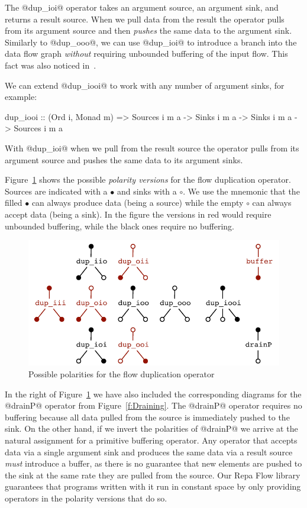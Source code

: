 The @dup_ioi@ operator takes an argument source, an argument sink, and returns a result source. When we pull data from the result the operator pulls from its argument source and then \emph{pushes} the same data to the argument sink. Similarly to @dup_ooo@, we can use @dup_ioi@ to introduce a branch into the data flow graph \emph{without} requiring unbounded buffering of the input flow. This fact was also noticed in~\cite{Bernardy:Duality}.

\eject
We can extend @dup_iooi@ to work with any number of argument sinks, for example:
\begin{code}
 dup_iooi
  :: (Ord i, Monad m)
  => Sources i m a -> Sinks i m a -> Sinks i m a
  -> Sources i m a
\end{code}

With @dup_ioi@ when we pull from the result source the operator pulls from its argument source and pushes the same data to its argument sinks. 

Figure~\ref{f:Polarity} shows the possible \emph{polarity versions} for the flow duplication operator. Sources are indicated with a $\bullet$ and sinks with a $\circ$. We use the mnemonic that the filled $\bullet$ can always produce data (being a source) while the empty $\circ$ can always accept data (being a sink). In the figure the versions in red would require unbounded buffering, while the black ones require no buffering.

\begin{figure}
\includegraphics[scale=0.7]{figures/polarity.pdf}

\caption{Possible polarities for the flow duplication operator}
\label{f:Polarity}
\end{figure}

In the right of Figure~\ref{f:Polarity} we have also included the corresponding diagrams for the @drainP@ operator from Figure~\ref{f:Draining}. The @drainP@ operator requires no buffering because all data pulled from the source is immediately pushed to the sink. On the other hand, if we invert the polarities of @drainP@ we arrive at the natural assignment for a primitive buffering operator. Any operator that accepts data via a single argument sink and produces the same data via a result source \emph{must} introduce a buffer, as there is no guarantee that new elements are pushed to the sink at the same rate they are pulled from the source. Our Repa Flow library guarantees that programs written with it run in constant space by only providing operators in the polarity versions that do so.


